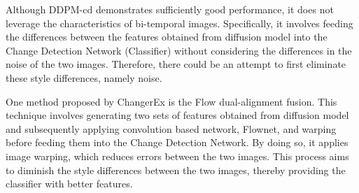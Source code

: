 \documentclass[../main.tex]{subfiles}
\begin{document}
\textbf{}
Although DDPM-cd demonstrates sufficiently good performance, it does not leverage the characteristics of bi-temporal images. Specifically, it involves feeding the differences between the features obtained from diffusion model into the Change Detection Network (Classifier) without considering the differences in the noise of the two images. Therefore, there could be an attempt to first eliminate these style differences, namely noise.

One method proposed by ChangerEx is the Flow dual-alignment fusion.\cite{fang2023changerex} This technique involves generating two sets of features obtained from diffusion model and subsequently applying convolution based network, Flownet, and warping before feeding them into the Change Detection Network. By doing so, it applies image warping, which reduces errors between the two images. This process aims to diminish the style differences between the two images, thereby providing the classifier with better features.
\end{document}
